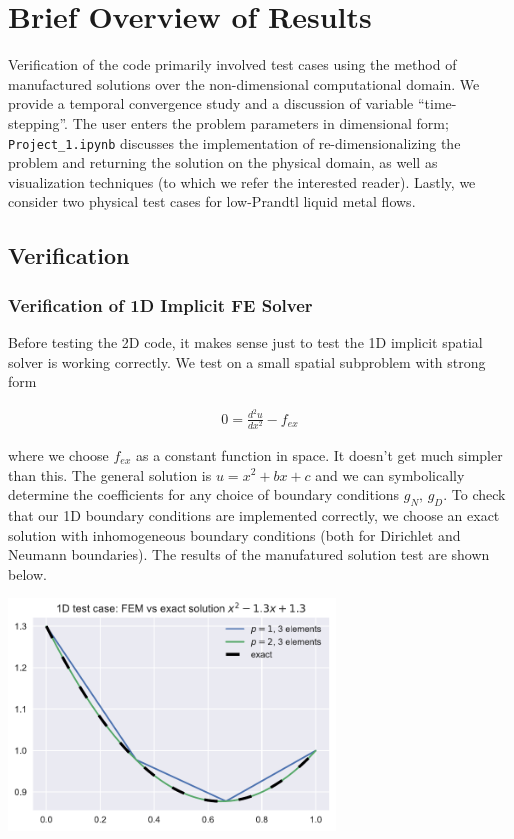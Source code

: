 \documentclass[10pt]{article}
\begin{document}
\section{Brief Overview of Results}

  Verification of the code primarily involved test cases using the method of manufactured solutions
  over the non-dimensional computational domain. We provide a temporal convergence study and a
  discussion of variable ``time-stepping''.  The user enters the problem parameters in dimensional
  form; \texttt{Project\_1.ipynb} discusses the implementation of re-dimensionalizing the problem
  and returning the solution on the physical domain, as well as visualization techniques (to which
  we refer the interested reader). Lastly, we consider two physical test cases for low-Prandtl
  liquid metal flows.

  \subsection{Verification}
  \subsubsection{Verification of 1D Implicit FE Solver}

  Before testing the 2D code, it makes sense just to test the 1D implicit spatial solver is working
  correctly.  We test on a small spatial subproblem with strong form

  \begin{align}
    0= \frac{d^2 u}{dx^2} - f_{ex}
  \end{align}

  where we choose $f_{ex}$ as a constant function in space. It doesn't get much simpler than this.
  The general solution is $u = x^2 + bx + c$ and we can symbolically determine the coefficients for
  any choice of boundary conditions $g_N,\, g_D$.  To check that our 1D boundary conditions are
  implemented correctly, we choose an exact solution with inhomogeneous boundary conditions (both
  for Dirichlet and Neumann boundaries).  The results of the manufatured solution test are shown
  below. \\
  
  \centerline{\includegraphics[width=0.65\textwidth]{img/1D_test.pdf}}
\end{document}
